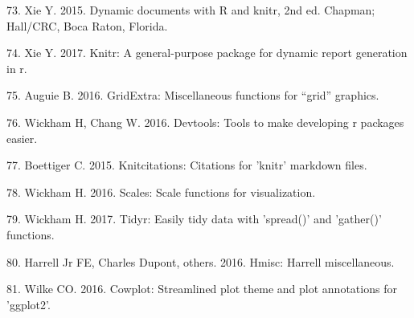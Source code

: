 \documentclass[11pt,]{article}
\begin{document}
\hypertarget{ref-knitr2015}{}
73. Xie Y. 2015. Dynamic documents with R and knitr, 2nd ed. Chapman;
Hall/CRC, Boca Raton, Florida.

\hypertarget{ref-knitr2017}{}
74. Xie Y. 2017. Knitr: A general-purpose package for dynamic report
generation in r.

\hypertarget{ref-gridExtra}{}
75. Auguie B. 2016. GridExtra: Miscellaneous functions for ``grid''
graphics.

\hypertarget{ref-devtools}{}
76. Wickham H, Chang W. 2016. Devtools: Tools to make developing r
packages easier.

\hypertarget{ref-knitcitations}{}
77. Boettiger C. 2015. Knitcitations: Citations for 'knitr' markdown
files.

\hypertarget{ref-scales}{}
78. Wickham H. 2016. Scales: Scale functions for visualization.

\hypertarget{ref-tidyr}{}
79. Wickham H. 2017. Tidyr: Easily tidy data with 'spread()' and
'gather()' functions.

\hypertarget{ref-Hmisc}{}
80. Harrell Jr FE, Charles Dupont, others. 2016. Hmisc: Harrell
miscellaneous.

\hypertarget{ref-cowplot}{}
81. Wilke CO. 2016. Cowplot: Streamlined plot theme and plot annotations
for 'ggplot2'.
\end{document}
